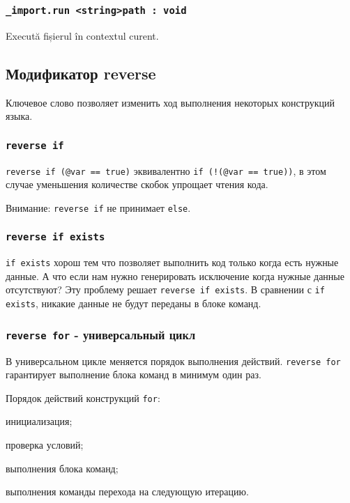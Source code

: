 \subsubsection{\lstinline|_import.run <string>path : void|}

Execută fișierul în contextul curent.

\subsection{Модификатор {\color{blue2} reverse}}

Ключевое слово  позволяет изменить ход выполнения некоторых конструкций языка.

\subsubsection{\lstinline|reverse if|}

\lstinline|reverse if (@var == true)| эквивалентно \lstinline|if (!(@var == true))|, в этом случае уменьшения количестве скобок упрощает чтения кода. 

Внимание: \lstinline|reverse if| не принимает \lstinline|else|.

\subsubsection{\lstinline|reverse if exists|}

\lstinline|if exists| хорош тем что позволяет выполнить код только когда есть нужные данные. А что если нам нужно генерировать исключение когда нужные данные отсутствуют? Эту проблему решает \lstinline|reverse if exists|. В сравнении с \lstinline|if exists|, никакие данные не будут переданы в блоке команд.

\subsubsection{\lstinline|reverse for| - универсальный цикл}

В универсальном цикле меняется порядок выполнения действий. \lstinline|reverse for| гарантирует выполнение блока команд в минимум один раз.

Порядок действий конструкций \lstinline|for|:
\begin{icEnum}
	\item инициализация;
	\item проверка условий;
	\item выполнения блока команд;
	\item выполнения команды перехода на следующую итерацию.
\end{icEnum}

